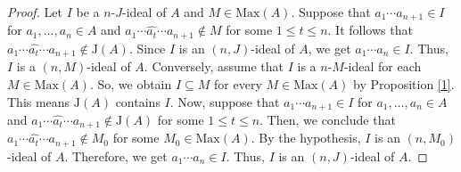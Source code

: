 \documentclass[10pt,a4paper]{amsart}
\numberwithin{equation}{section}
\begin{document}
\begin{proof}
Let $I$ be a $n$-$J$-ideal of $A$ and $M \in \text{Max}(A)$. Suppose that $a_1\cdots a_{n+1} \in I$ for $a_1,\ldots,a_n \in A$ and $a_1\cdots \widehat{a_t} \cdots a_{n+1} \notin M$ for some $1 \leq t \leq n$. It follows that  $a_1\cdots \widehat{a_t} \cdots a_{n+1} \notin \text{J}(A)$. Since $I$ is an $(n,J)$-ideal of $A$, we get $a_1\cdots a_n \in I$. Thus, $I$ is a $(n,M)$-ideal of $A$. Conversely, assume that  $I$ is a $n$-$M$-ideal for each  $M \in \text{Max}(A)$. So, we obtain  $I \subseteq M$ for every $M \in \text{Max}(A)$ by Proposition \ref{1}. This  means $\text{J}(A)$ contains $I$. Now, suppose that $a_1\cdots a_{n+1} \in I$ for $a_1,\ldots,a_n \in A$ and $a_1\cdots \widehat{a_t} \cdots a_{n+1} \notin \text{J}(A)$ for some $1 \leq t \leq n$. Then, we conclude that  $a_1\cdots \widehat{a_t} \cdots a_{n+1} \notin M_0$ for some $M_0 \in \text{Max}(A)$. By the hypothesis, $I$  is an $(n,M_0)$-ideal of $A$. Therefore, we get $a_1\cdots a_n \in I$. Thus,  $I$ is an $(n,J)$-ideal of $A$.
\end{proof}
\end{document}
